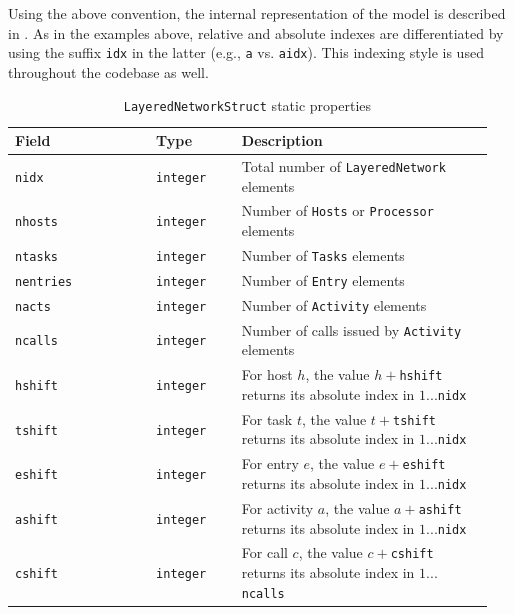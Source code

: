 Using the above convention, the internal representation of the model is described in . As in the examples above, relative and absolute indexes are differentiated by using the suffix \texttt{idx} in the latter (e.g., \texttt{a}  vs. \texttt{aidx}). This indexing style is used throughout the codebase as well.

\begin{MATLAB}

{\scriptsize
\begin{longtable}{|p{0.28\linewidth}|p{0.17\linewidth}|p{0.50\linewidth}|}
\caption{\texttt{LayeredNetworkStruct} static properties}\label{TAB_LQNPAR}\\
\hline
\textbf{Field} & \textbf{Type} & \textbf{Description} \\
\hline
\texttt{nidx} & \texttt{integer} & Total number of \texttt{LayeredNetwork} elements \\\hline
\texttt{nhosts} & \texttt{integer} & Number of \texttt{Hosts} or \texttt{Processor} elements \\\hline
\texttt{ntasks} & \texttt{integer} & Number of \texttt{Tasks} elements \\\hline
\texttt{nentries} & \texttt{integer} & Number of \texttt{Entry} elements \\\hline
\texttt{nacts} & \texttt{integer} & Number of \texttt{Activity} elements \\\hline
\texttt{ncalls} & \texttt{integer} & Number of calls issued by \texttt{Activity} elements \\\hline
\texttt{hshift} & \texttt{integer} & For host $h$, the value $h+$\texttt{hshift} returns its absolute index in $1...$\texttt{nidx} \\\hline
\texttt{tshift} & \texttt{integer} & For task $t$, the value $t+$\texttt{tshift} returns its absolute index in $1...$\texttt{nidx} \\\hline
\texttt{eshift} & \texttt{integer} & For entry $e$, the value $e+$\texttt{eshift} returns its absolute index in $1...$\texttt{nidx} \\\hline
\texttt{ashift} & \texttt{integer} & For activity $a$, the value $a+$\texttt{ashift} returns its absolute index in $1...$\texttt{nidx} \\\hline
\texttt{cshift} & \texttt{integer} & For call $c$, the value $c+$\texttt{cshift} returns its absolute index in $1...$\texttt{ncalls} \\\hline

\end{longtable}}
\end{MATLAB}
